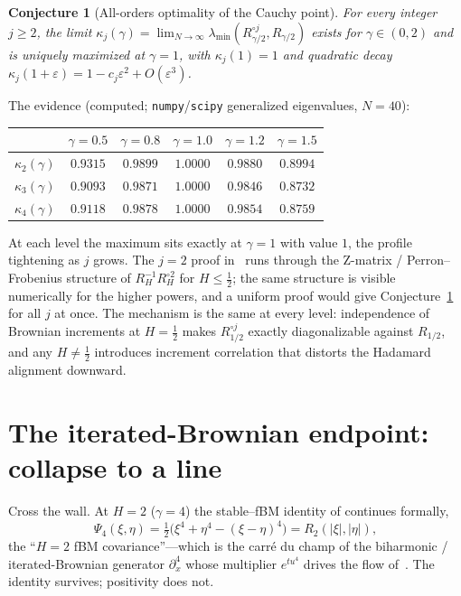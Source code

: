 \documentclass[11pt,reqno]{amsart}
\theoremstyle{plain}
\newtheorem{conjecture}[theorem]{Conjecture}
\theoremstyle{definition}
\theoremstyle{remark}
\newcommand{\Had}{\circ}
\begin{document}
\begin{conjecture}[All-orders optimality of the Cauchy point]
\label{conj:phase}
For every integer $j\ge2$, the limit
$\kappa_j(\gamma)=\lim_{N\to\infty}\lambda_{\min}(R_{\gamma/2}^{\Had j},
R_{\gamma/2})$ exists for $\gamma\in(0,2)$ and is uniquely maximized at
$\gamma=1$, with $\kappa_j(1)=1$ and quadratic decay
$\kappa_j(1+\varepsilon)=1-c_j\varepsilon^2+O(\varepsilon^3)$.
\end{conjecture}

The evidence (computed; \texttt{numpy}/\texttt{scipy} generalized
eigenvalues, $N=40$):
\begin{center}
\begin{tabular}{rccccc}
\hline
 & $\gamma=0.5$ & $\gamma=0.8$ & $\gamma=1.0$ & $\gamma=1.2$ & $\gamma=1.5$\\
\hline
$\kappa_2(\gamma)$ & $0.9315$ & $0.9899$ & $1.0000$ & $0.9880$ & $0.8994$\\
$\kappa_3(\gamma)$ & $0.9093$ & $0.9871$ & $1.0000$ & $0.9846$ & $0.8732$\\
$\kappa_4(\gamma)$ & $0.9118$ & $0.9878$ & $1.0000$ & $0.9854$ & $0.8759$\\
\hline
\end{tabular}
\end{center}
At each level the maximum sits exactly at $\gamma=1$ with value $1$, the
profile tightening as $j$ grows. The $j=2$ proof in~\cite{FontesBE}
runs through the Z-matrix / Perron--Frobenius structure of
$R_H^{-1}R_H^{\Had2}$ for $H\le\tfrac12$; the same structure is visible
numerically for the higher powers, and a uniform proof would give
Conjecture~\ref{conj:phase} for all $j$ at once. The mechanism is the
same at every level: independence of Brownian increments at $H=\tfrac12$
makes $R_{1/2}^{\Had j}$ exactly diagonalizable against $R_{1/2}$, and
any $H\neq\tfrac12$ introduces increment correlation that distorts the
Hadamard alignment downward.

\section{The iterated-Brownian endpoint: collapse to a line}
\label{sec:ibm}

Cross the wall. At $H=2$ ($\gamma=4$) the stable--fBM identity of
\cite{FontesBE} continues formally,
\[
   \Psi_4(\xi,\eta)=\tfrac12\bigl(\xi^4+\eta^4-(\xi-\eta)^4\bigr)
   =R_2(|\xi|,|\eta|),
\]
the ``$H=2$ fBM covariance''---which is the carr\'e du champ of the
biharmonic / iterated-Brownian generator $\partial_x^4$ whose
multiplier $e^{tu^4}$ drives the flow of~\cite{FontesIBM}. The identity
survives; positivity does not.
\end{document}

